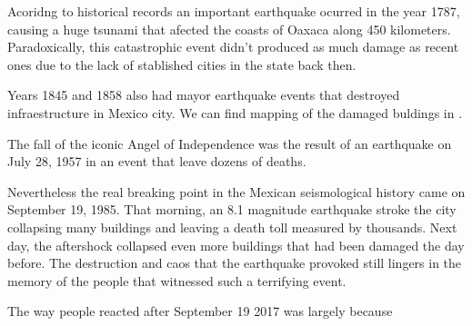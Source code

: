 Acoridng to historical records an important earthquake ocurred in the year 1787, causing a huge tsunami that afected the coasts of Oaxaca along 450 kilometers. Paradoxically, this catastrophic event didn't produced as much damage as recent ones due to the lack of stablished cities in the state back then.

Years 1845 and 1858 also had mayor earthquake events that destroyed infraestructure in Mexico city. We can find mapping of the damaged buldings in \cite{AG3316}.

The fall of the iconic Angel of Independence was the result of an earthquake on July 28, 1957 in an event that leave dozens of deaths.

Nevertheless the real breaking point in the Mexican seismological history came on September 19, 1985. That morning, an 8.1 magnitude earthquake stroke the city collapsing many buildings and leaving a death toll measured by thousands. Next day, the aftershock collapsed even more buildings that had been damaged the day before. The destruction and caos that the earthquake provoked still lingers in the memory of the people that witnessed such a terrifying event.

The way people reacted after September 19 2017 was largely because 

\begin{figure}[h]
  \begin{center}
  \end{center}
\end{figure}


